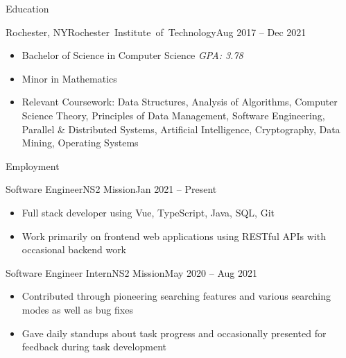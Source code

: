 \documentclass[]{mcdowellcv}
\begin{document}
	\makeheader
	
	\begin{cvsection}{Education}
		\begin{cvsubsection}{Rochester, NY}{\mbox{Rochester Institute of Technology}}{Aug 2017 -- Dec 2021}
			\begin{itemize}
				\item Bachelor of Science in Computer Science \hfill \textit{GPA: 3.78}
				\item Minor in Mathematics
				\item Relevant Coursework: Data Structures, Analysis of Algorithms, Computer Science Theory, Principles of Data Management, Software Engineering, Parallel \& Distributed Systems, Artificial Intelligence, 
				Cryptography, Data Mining, Operating Systems
			\end{itemize}
		\end{cvsubsection}
	\end{cvsection}
	
	\begin{cvsection}{Employment}
		\begin{cvsubsection}{Software Engineer}{NS2 Mission}{Jan 2021 -- Present}	
			\begin{itemize}
				\item Full stack developer using Vue, TypeScript, Java, SQL, Git
				\item Work primarily on frontend web applications using RESTful APIs with occasional backend work
			\end{itemize}
		\end{cvsubsection}

		\begin{cvsubsection}{Software Engineer Intern}{NS2 Mission}{May 2020 -- Aug 2021}	
			\begin{itemize}
				\item Contributed through pioneering searching features and various searching modes as well as bug fixes
				\item Gave daily standups about task progress and occasionally presented for feedback during task development
			\end{itemize}
		\end{cvsubsection}
	\end{cvsection}
	
\end{document}
